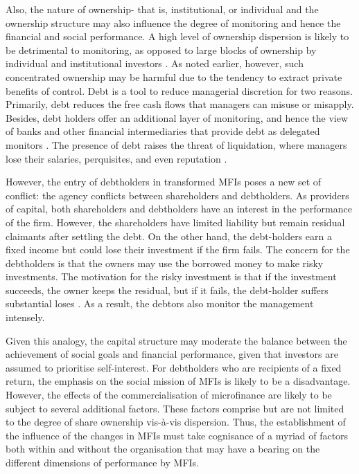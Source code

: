 \documentclass[a4paper,nobind]{templates/ociamthesis}
\begin{document}
Also, the nature of ownership- that is, institutional, or individual and the ownership structure may also influence the degree of monitoring and hence the financial and social performance. A high level of ownership dispersion is likely to be detrimental to monitoring, as opposed to large blocks of ownership by individual and institutional investors \autocite{becht1999blockholdings}. As noted earlier, however, such concentrated ownership may be harmful due to the tendency to extract private benefits of control.
Debt is a tool to reduce managerial discretion for two reasons. Primarily, debt reduces the free cash flows that managers can misuse or misapply. Besides, debt holders offer an additional layer of monitoring, and hence the view of banks and other financial intermediaries that provide debt as delegated monitors \autocite{diamond1996financial}. The presence of debt raises the threat of liquidation, where managers lose their salaries, perquisites, and even reputation \autocite{jensen1976theory}.

However, the entry of debtholders in transformed MFIs poses a new set of conflict: the agency conflicts between shareholders and debtholders. As providers of capital, both shareholders and debtholders have an interest in the performance of the firm. However, the shareholders have limited liability but remain residual claimants after settling the debt. On the other hand, the debt-holders earn a fixed income but could lose their investment if the firm fails. The concern for the debtholders is that the owners may use the borrowed money to make risky investments. The motivation for the risky investment is that if the investment succeeds, the owner keeps the residual, but if it fails, the debt-holder suffers substantial loses \autocite{chu2017shareholder}. As a result, the debtors also monitor the management intensely.

Given this analogy, the capital structure may moderate the balance between the achievement of social goals and financial performance, given that investors are assumed to prioritise self-interest. For debtholders who are recipients of a fixed return, the emphasis on the social mission of MFIs is likely to be a disadvantage. However, the effects of the commercialisation of microfinance are likely to be subject to several additional factors. These factors comprise but are not limited to the degree of share ownership vis-à-vis dispersion. Thus, the establishment of the influence of the changes in MFIs must take cognisance of a myriad of factors both within and without the organisation that may have a bearing on the different dimensions of performance by MFIs.
\end{document}
